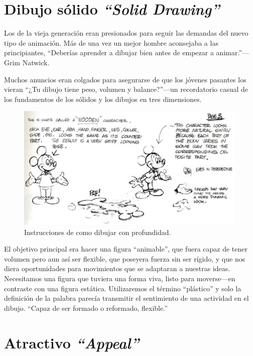 \documentclass[a4paper,12pt]{report}
\begin{document}
 
 
\section{Dibujo sólido \textit{``Solid Drawing''}}
 
 
Los de la vieja generación eran presionados para seguir las demandas del nuevo tipo de animación.
Más de una vez un mejor hombre aconsejaba a las principiantes, ``Deberías aprender a dibujar bien antes de empezar a animar.''---Grim Natwick.
 
Muchos anuncios eran colgados para asegurarse de que los jóvenes pasantes los vieran ``¿Tu dibujo tiene peso, volumen y balance?''---un recordatorio casual
de los fundamentos de los sólidos y los dibujos en tres dimensiones.\cite{principles_animation}
 
\begin{figure}[ht]
    \centering
    \includegraphics[height=6cm]{Imagenes/wooden_character}
    \caption{Instrucciones de como dibujar con profundidad.}
    \label{fig:wooden_character}
\end{figure}
 
 
El objetivo principal era hacer una figura ``animable'', que fuera capaz de tener volumen pero aun así ser flexible, que poseyera fuerza sin ser rígido, 
y que nos diera oportunidades para movimientos que se adaptaran a nuestras ideas. Necesitamos una figura que tuviera una forma viva, listo para moverse---en contraste
con una figura estática. Utilizaremos el término ``plástico'' y solo la definición de la palabra parecía transmitir el sentimiento de una actividad en el dibujo.
``Capaz de ser formado o reformado, flexible.''\cite{principles_animation}
 
 
\section{Atractivo \textit{``Appeal''}}
 
\end{document}
